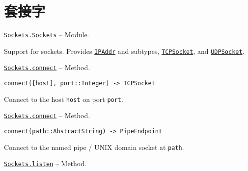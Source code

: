 \hypertarget{16962550433784269272}{}


\chapter{套接字}


\hypertarget{16889258743067172297}{}
\hyperlink{16889258743067172297}{\texttt{Sockets.Sockets}}  -- {Module.}

\begin{adjustwidth}{2em}{0pt}

Support for sockets. Provides \hyperlink{8098410990676145612}{\texttt{IPAddr}} and subtypes, \hyperlink{5453047654537213204}{\texttt{TCPSocket}}, and \hyperlink{5627851531738059255}{\texttt{UDPSocket}}.



\end{adjustwidth}
\hypertarget{6670528757550466821}{}
\hyperlink{6670528757550466821}{\texttt{Sockets.connect}}  -- {Method.}

\begin{adjustwidth}{2em}{0pt}


\begin{verbatim}
connect([host], port::Integer) -> TCPSocket
\end{verbatim}

Connect to the host \texttt{host} on port \texttt{port}.



\end{adjustwidth}
\hypertarget{15285016070454152057}{}
\hyperlink{15285016070454152057}{\texttt{Sockets.connect}}  -- {Method.}

\begin{adjustwidth}{2em}{0pt}


\begin{verbatim}
connect(path::AbstractString) -> PipeEndpoint
\end{verbatim}

Connect to the named pipe / UNIX domain socket at \texttt{path}.



\end{adjustwidth}
\hypertarget{780704944207038170}{}
\hyperlink{780704944207038170}{\texttt{Sockets.listen}}  -- {Method.}

